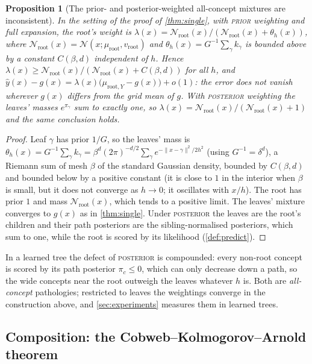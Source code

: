 \documentclass[11pt]{article}
\newtheorem{proposition}[theorem]{Proposition}
\theoremstyle{definition}
\theoremstyle{remark}
\newcommand{\N}{\mathcal{N}}
\newcommand{\hy}{\hat{y}}
\begin{document}
\begin{proposition}[The prior- and posterior-weighted all-concept mixtures are inconsistent]\label{prop:prior}
In the setting of the proof of \cref{thm:single}, with \textsc{prior} weighting and full
expansion, the root's weight is
$\lambda(x)=\N_{\text{root}}(x)/(\N_{\text{root}}(x)+\theta_h(x))$, where
$\N_{\text{root}}(x)=\N(x;\mu_{\text{root}},v_{\text{root}})$ and
$\theta_h(x)=G^{-1}\sum_\gamma k_\gamma$ is bounded above by a constant $C(\beta,d)$
independent of $h$.  Hence $\lambda(x)\ge\N_{\text{root}}(x)/(\N_{\text{root}}(x)+C(\beta,d))$
for all $h$, and $\hy(x)-g(x)=\lambda(x)\bigl(\mu_{\text{root},Y}-g(x)\bigr)+o(1)$: the
error does not vanish wherever $g(x)$ differs from the grid mean of $g$.  With
\textsc{posterior} weighting the leaves' masses $e^{\pi_\gamma}$ sum to exactly one, so
$\lambda(x)=\N_{\text{root}}(x)/(\N_{\text{root}}(x)+1)$ and the same conclusion holds.
\end{proposition}
\begin{proof}
Leaf $\gamma$ has prior $1/G$, so the leaves' mass is $\theta_h(x)=G^{-1}\sum_\gamma
k_\gamma=\beta^d(2\pi)^{-d/2}\sum_\gamma e^{-\|x-\gamma\|^2/2h^2}$ (using $G^{-1}=\delta^d$),
a Riemann sum of mesh $\beta$ of the standard Gaussian density, bounded by $C(\beta,d)$
and bounded below by a positive constant (it is close to $1$ in the interior when
$\beta$ is small, but it does not converge as $h\to0$; it oscillates with $x/h$).  The root has prior $1$ and mass $\N_{\text{root}}(x)$, which tends to a positive limit.
The leaves' mixture converges to $g(x)$ as in \cref{thm:single}.  Under \textsc{posterior}
the leaves are the root's children and their path posteriors are the sibling-normalised
posteriors, which sum to one, while the root is scored by its likelihood
(\cref{def:predict}).
\end{proof}

In a learned tree the defect of \textsc{posterior} is compounded: every non-root concept
is scored by its path posterior $\pi_c\le0$, which can only decrease down a path, so the
wide concepts near the root outweigh the leaves whatever $h$ is.  Both are
\emph{all-concept} pathologies; restricted to leaves the weightings converge in the
construction above, and \cref{sec:experiments} measures them in learned trees.

\subsection{Composition: the Cobweb--Kolmogorov--Arnold theorem}
\end{document}
